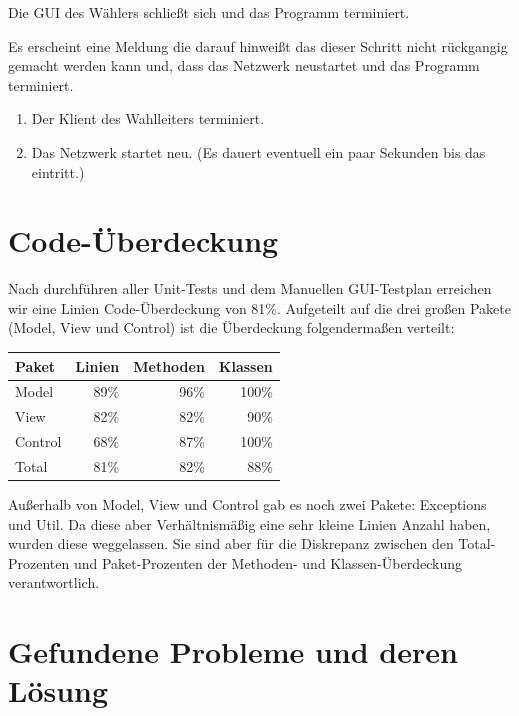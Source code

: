 \documentclass[parskip=full]{scrartcl}
\begin{document}
		{Die GUI des Wählers schließt sich und das Programm terminiert.}


		{Es erscheint eine Meldung die darauf hinweißt das dieser Schritt nicht rückgangig gemacht werden kann und, dass das Netzwerk neustartet und das Programm terminiert.}

		{\begin{enumerate}
			\item Der Klient des Wahlleiters terminiert.
			\item Das Netzwerk startet neu. (Es dauert eventuell ein paar Sekunden bis das eintritt.)
		\end{enumerate}}

\section{Code-Überdeckung}
Nach durchführen aller Unit-Tests und dem Manuellen GUI-Testplan erreichen wir eine Linien Code-Überdeckung von 81\%.
Aufgeteilt auf die drei großen Pakete (Model, View und Control) ist die Überdeckung folgendermaßen verteilt:

\begin{table}[h!]
	\begin{tabular}[t]{l r r r}
		Paket & Linien & Methoden & Klassen \\ \hline
		Model & 89\% & 96\% & 100\% \\
		View & 82\% & 82\% & 90\% \\
		Control & 68\% & 87\% & 100\% \\ \hline
		Total & 81\% & 82\% & 88\% \\
	\end{tabular}
\end{table}

Außerhalb von Model, View und Control gab es noch zwei Pakete: Exceptions und Util. Da diese aber Verhältnismäßig eine sehr kleine Linien Anzahl haben, wurden diese weggelassen. Sie sind aber für die Diskrepanz zwischen den Total-Prozenten und Paket-Prozenten der Methoden- und Klassen-Überdeckung verantwortlich.

\section{Gefundene Probleme und deren Lösung}
\end{document}
